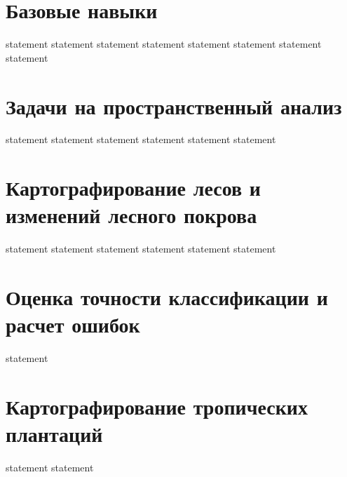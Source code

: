 \section{Базовые навыки}

{statement}
{statement}
{statement}
{statement}
{statement}
{statement}
{statement}
{statement}

\section{Задачи на пространственный анализ}

{statement}
{statement}
{statement}
{statement}
{statement}
{statement}

\section{Картографирование лесов и изменений лесного покрова}

{statement}
{statement}
{statement}
{statement}
{statement}
{statement}

\section{Оценка точности классификации и расчет ошибок}

{statement}

\section{Картографирование тропических плантаций}

{statement}
{statement}
